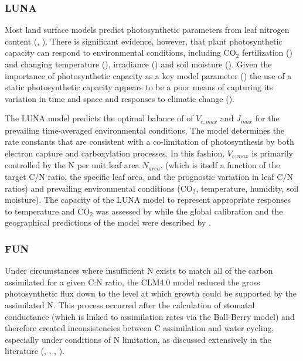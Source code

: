 \documentclass[draft,linenumbers]{agujournal}
\begin{document}
\subsubsection{LUNA}
Most land surface models predict photosynthetic parameters from leaf nitrogen content (\cite{kattge2009}, \cite{bonan2012}). There is significant evidence, however, that plant photosynthetic capacity can respond to environmental conditions, including CO$_{2}$ fertilization (\cite{ainsworth2007}) and changing temperature (\cite{hikosaka2005}), irradiance (\cite{niinemets1998}) and soil moisture (\cite{keenan2009}). Given the importance of photosynthetic capacity as a key model parameter (\cite{rogers2017}) the use of a static photosynthetic capacity appears to be a poor means of capturing its variation in time and space and responses to climatic change (\cite{walker2017}).


The LUNA model predicts the optimal balance of of $V_{c,max}$ and $J_{max}$ for the prevailing time-averaged environmental conditions. The model determines the rate constants that are consistent with a co-limitation of photosynthesis by both electron capture and carboxylation processes. In this fashion, $V_{c,max}$ is primarily controlled by the N per unit leaf area $N_{area}$, (which is itself a function of the target C/N ratio, the specific leaf area, and the prognostic variation in leaf C/N ratios) and prevailing environmental conditions (CO$_{2}$, temperature, humidity, soil moisture). The capacity of the LUNA model to represent appropriate responses to temperature and CO$_{2}$ was assessed by \cite{xu2012} while the global calibration and the geographical predictions of the model were described by \cite{ali2016}.


\subsubsection{FUN}

Under circumstances where insufficient N exists to match all of the carbon assimilated for a given C:N ratio, the CLM4.0 model reduced the gross photosynthetic flux down to the level at which growth could be supported by the assimilated N. This process occurred after the calculation of stomatal conductance (which is linked to assimilation rates via the Ball-Berry model) and therefore created inconsistencies between C assimilation and water cycling, especially under conditions of N limitation, as discussed extensively in the literature (\cite{medlyn2011}, \cite{bonan2012}, \cite{dekauwe2014}, \cite{walker2014}).
\end{document}
